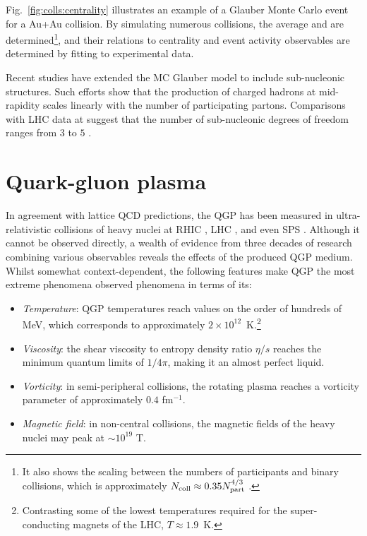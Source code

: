 Fig.~\ref{fig:colls:centrality} illustrates an example of a Glauber Monte Carlo event for a Au+Au collision. By simulating numerous collisions, the average \Npart and \Ncoll are determined\footnote{It also shows the scaling between the numbers of participants and binary collisions, which is approximately $N_\mathrm{coll} \approx 0.35 N_\mathrm{part}^{4/3}$ .}, and their relations to centrality and event activity observables are determined by fitting to experimental data.

Recent studies have extended the MC Glauber model to include sub-nucleonic structures. Such efforts show that the production of charged hadrons at mid-rapidity scales linearly with the number of participating partons. Comparisons with LHC data at  suggest that the number of sub-nucleonic degrees of freedom ranges from $3$ to $5$ \cite{loizides-extendedMC}.

\section{Quark-gluon plasma}

In agreement with lattice QCD predictions, the QGP has been measured in ultra-relativistic collisions of heavy nuclei at RHIC \cite{rhic-qgp}, LHC \cite{lhc-qgp}, and even SPS \cite{sps-qgp}. Although it cannot be observed directly, a wealth of evidence from three decades of research combining various observables reveals the effects of the produced QGP medium. Whilst somewhat context-dependent, the following features make QGP the most extreme phenomena observed phenomena in terms of its:
\begin{itemize}
\item \textit{Temperature}: QGP temperatures reach values on the order of hundreds of MeV, which corresponds to approximately $2 \times 10^{12}$~K.\footnote{Contrasting some of the lowest temperatures required for the super-conducting magnets of the LHC, $T \approx 1.9$~K.}
\item \textit{Viscosity}: the shear viscosity to entropy density ratio $\eta/s$ reaches the minimum quantum limits of $1/4\pi$, making it an almost perfect liquid.
\item \textit{Vorticity}: in semi-peripheral collisions, the rotating plasma reaches a vorticity parameter of approximately $0.4$ fm$^{-1}$.
\item \textit{Magnetic field}: in non-central collisions, the magnetic fields of the heavy nuclei may peak at $\sim 10^{19}$ T.
\end{itemize}

